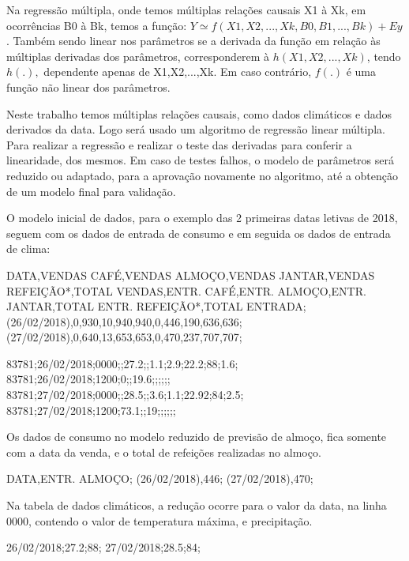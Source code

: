 \documentclass[	12pt, Times, openright, twoside, a4paper, english, brazil]{abntex2}
\begin{document}
Na regressão múltipla, onde temos múltiplas relações causais X1 à Xk, em ocorrências B0 à Bk, temos a função: $Y \simeq f(X1, X2, ..., Xk, B0, B1, ..., Bk) + Ey$. Também sendo linear nos parâmetros se a derivada da função em relação às múltiplas derivadas dos parâmetros, corresponderem à $h(X1,X2,...,Xk)$, tendo $h(.),$ dependente apenas de X1,X2,...,Xk. Em caso contrário, $f(.)$ é uma função não linear dos parâmetros.

Neste trabalho temos múltiplas relações causais, como dados climáticos e dados derivados da data. Logo será usado um algoritmo de regressão linear múltipla. Para realizar a regressão e realizar o teste das derivadas para conferir a linearidade, dos mesmos. Em caso de testes falhos, o modelo de parâmetros será reduzido ou adaptado, para a aprovação novamente no algoritmo, até a obtenção de um modelo final para validação.

O modelo inicial de dados, para o exemplo das 2 primeiras datas letivas de 2018, seguem com os dados de entrada de consumo e em seguida os dados de entrada de clima: 
\begin{algorithm}
DATA,VENDAS CAFÉ,VENDAS ALMOÇO,VENDAS JANTAR,VENDAS REFEIÇÃO*,TOTAL VENDAS,ENTR. CAFÉ,ENTR. ALMOÇO,ENTR. JANTAR,TOTAL ENTR. REFEIÇÃO*,TOTAL ENTRADA;
(26/02/2018),0,930,10,940,940,0,446,190,636,636;
(27/02/2018),0,640,13,653,653,0,470,237,707,707;   
\end{algorithm}

\begin{algorithm}
83781;26/02/2018;0000;;27.2;;1.1;2.9;22.2;88;1.6;
83781;26/02/2018;1200;0;;19.6;;;;;;
83781;27/02/2018;0000;;28.5;;3.6;1.1;22.92;84;2.5;
83781;27/02/2018;1200;73.1;;19;;;;;;   
\end{algorithm}

Os dados de consumo no modelo reduzido de previsão de almoço, fica somente com a data da venda, e o total de refeições realizadas no almoço.

\begin{algorithm}
DATA,ENTR. ALMOÇO;
(26/02/2018),446;
(27/02/2018),470;   
\end{algorithm}

Na tabela de dados climáticos, a redução ocorre para o valor da data, na linha 0000, contendo o valor de temperatura máxima, e precipitação.

\begin{algorithm}
26/02/2018;27.2;88;
27/02/2018;28.5;84;
\end{algorithm}
\end{document}
